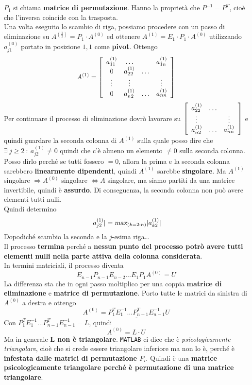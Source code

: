 \documentclass[10pt]{book}
\begin{document}
$P_1$ si chiama \textbf{matrice di permutazione}. Hanno la proprietà che $P^{-1} = P^{T}$, cioè che l'inversa coincide con la trasposta.\\
Una volta eseguito lo scambio di riga, possiamo procedere con un passo di eliminazione su $A^{(\frac{1}{2})} = P_1\cdot A^{(0)}$ ed ottenere $A^{(1)} = E_1\cdot P_1\cdot A^{(0)}$ utilizzando $a_{j1}^{(0)}$ portato in posizione $1, 1$ come \textbf{pivot}. Ottengo
$$A^{(1)} = \left[
\begin{array}{c c c c}
a_{11}^{(1)} & \ldots & & a_{1n}^{(1)} \\
0 & a_{22}^{(1)} & \ldots\\
\vdots & \vdots & & \vdots\\
0 & a_{n2}^{(1)} & \ldots & a_{nn}^{(1)}
\end{array}
\right]$$
Per continuare il processo di eliminazione dovrò lavorare su $\left[
\begin{array}{c c c}
a_{22}^{(1)} & \ldots\\
\vdots & & \vdots\\
a_{n2}^{(1)} & \ldots & a_{nn}^{(1)}
\end{array}
\right]$ e quindi guardare la seconda colonna di $A^{(1)}$ sulla quale posso dire che $\exists\: j \geq 2\: : \: a_{j2}^{(1)} \neq 0$ quindi che c'è almeno un elemento $\neq 0$ sulla seconda colonna. Posso dirlo perché se tutti fossero $= 0$, allora la prima e la seconda colonna sarebbero \textbf{linearmente dipendenti}, quindi $A^{(1)}$ sarebbe \textbf{singolare}. Ma $A^{(1)}$ singolare $\Rightarrow A^{(0)}$ singolare $\Leftrightarrow A$ singolare, ma siamo partiti da una matrice invertibile, quindi è \textbf{assurdo}. Di conseguenza, la seconda colonna non può avere elementi tutti nulli.\\
Quindi determino $$|a_{j2}^{(1)}| = \textsl{max}_{(k = 2:n)}|a_{k2}^{(1)}|$$
Dopodiché scambio la seconda e la $j$-esima riga\ldots\\
Il processo \textbf{termina} perché a \textbf{nessun punto del processo potrò avere tutti elementi nulli nella parte attiva della colonna considerata}.\\
In termini matriciali, il processo diventa
$$E_{n-1}P_{n-1}E_{n-2}\ldots E_1P_1A^{(0)} = U$$
La differenza sta che in ogni passo moltiplico per una coppia \textbf{matrice di eliminazione} e \textbf{matrice di permutazione}. Porto tutte le matrici da sinistra di $A^{(0)}$ a destra e ottengo
$$A^{(0)} = \underline{P^T_1E^{-1}_1 \ldots P^T_{n-1}E^{-1}_{n-1}} U$$
Con $P^T_1E^{-1}_1 \ldots P^T_{n-1}E^{-1}_{n-1} = L$, quindi
$$A^{(0)} = L\cdot U$$
Ma in generale \textbf{L non è triangolare}. \texttt{MATLAB} ci dice che è \textit{psicologicamente triangolare}, cioè che si crede essere triangolare inferiore ma non lo è, perché è \textbf{infestata dalle matrici di permutazione $P_i$}. Quindi è una \textbf{matrice psicologicamente triangolare perché è permutazione di una matrice triangolare}.
\end{document}
